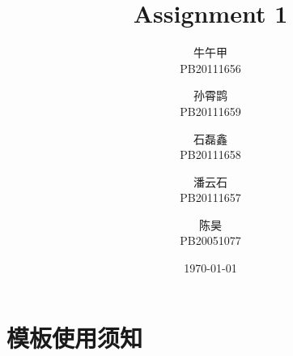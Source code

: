 \documentclass[lang=cn,a4paper,newtx]{elegantpaper}
\title{Assignment 1}
\author{牛午甲 \\ PB20111656 \and 孙霄鹍 \\ PB20111659 \and 石磊鑫 \\ PB20111658 \and 潘云石 \\ PB20111657 \and 陈昊 \\ PB20051077}
\institute{中国科学技术大学}
\date{\today}
\begin{document}
	
	\maketitle

\section{模板使用须知}


	
\end{document}
